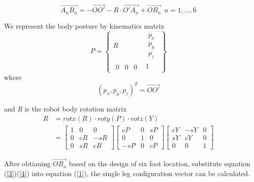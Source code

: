 \documentclass[conference]{IEEEtran}
\begin{document}
\begin{equation}\label{1}
    \overrightarrow{A_nB_n}= -\overrightarrow{OO'} - R \cdot \overrightarrow{O'A_n} + \overrightarrow{OB_n} \ \ n=1,...,6
\end{equation}
    
We represent the body posture by kinematics matrix 
\begin{equation}\label{3}
    P = \begin{Bmatrix}
           R & \begin{matrix}
                p_x \\ p_y \\ p_z
                \end{matrix} \\
        \begin{matrix}
        0 & 0 & 0 
        \end{matrix} & 1
        
    \end{Bmatrix}
\end{equation}
where \begin{equation} (p_x, p_y, p_z)^T = \overrightarrow{OO'}\end{equation}

and \textit{R} is the robot body rotation matrix 
\begin{equation}\label{4}
\begin{aligned}
R &= rotx(R)\cdot roty(P) \cdot rotz(Y)\\
&= \begin{bmatrix}
    1 & 0 & 0 \\
    0 & cR & -sR\\
    0 & sR & cR
    \end{bmatrix}
    \begin{bmatrix}
        cP & 0 & sP \\
        0 & 1 & 0\\
        -sP & 0 & cP
        \end{bmatrix}
        \begin{bmatrix}
            cY & -sY & 0 \\
            sY & cY & 0\\
            0 & 0 & 1
            \end{bmatrix}
\end{aligned}
\end{equation}

After obtianing \(\overrightarrow{OB_n}\) based on the design of six foot location, substitute equation (\ref{3})(\ref{4}) into equation (\ref{1}), the single leg configuration vector can be calculated.
\end{document}
